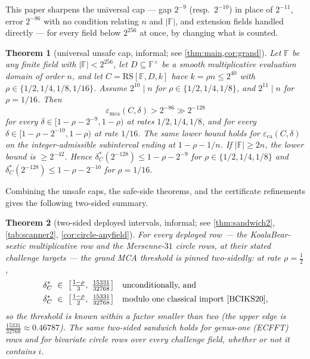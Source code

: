 \documentclass[11pt]{article}
\newtheorem{theorem}{Theorem}[section]
\theoremstyle{definition}
\theoremstyle{remark}
\newcommand{\F}{\mathbb{F}}
\newcommand{\RS}{\mathrm{RS}}
\newcommand{\eca}{\varepsilon_{\mathrm{ca}}}
\newcommand{\emca}{\varepsilon_{\mathrm{mca}}}
\begin{document}
This paper sharpens the universal cap --- gap $2^{-9}$ (resp.\ $2^{-10}$) in place of $2^{-11}$, error $2^{-86}$ with no condition relating $n$ and $|\F|$, and extension fields handled directly --- for every field below $2^{256}$ at once, by changing what is counted.


\begin{theorem}[universal unsafe cap, informal; see \cref{thm:main,cor:grand}]\label{thm:informal}
Let $\F$ be any finite field with $|\F|<2^{256}$, let $D\subseteq\F^\times$ be a smooth multiplicative evaluation domain of order $n$, and let $C=\RS[\F,D,k]$ have $k=\rho n\le2^{40}$ with $\rho\in\{1/2,1/4,1/8,1/16\}$. Assume $2^{10}\mid n$ for $\rho\in\{1/2,1/4,1/8\}$, and $2^{11}\mid n$ for $\rho=1/16$. Then
\[
\emca(C,\delta)>2^{-86}\gg2^{-128}
\]
for every $\delta\in[1-\rho-2^{-9},1-\rho)$ at rates $1/2,1/4,1/8$, and for every $\delta\in[1-\rho-2^{-10},1-\rho)$ at rate $1/16$. The same lower bound holds for $\eca(C,\delta)$ on the integer-admissible subinterval ending at $1-\rho-1/n$. If $|\F|\ge2n$, the lower bound is $\ge2^{-42}$. Hence $\delta^*_C(2^{-128})\le1-\rho-2^{-9}$ for $\rho\in\{1/2,1/4,1/8\}$ and $\delta^*_C(2^{-128})\le1-\rho-2^{-10}$ for $\rho=1/16$.
\end{theorem}

Combining the unsafe caps, the safe-side theorems, and the certificate refinements gives the following two-sided summary.

\begin{theorem}[two-sided deployed intervals, informal; see \cref{thm:sandwich2}, \cref{tab:scanner2}, \cref{cor:circle-anyfield}]\label{thm:informal-sandwich}
For every deployed row --- the KoalaBear-sextic multiplicative row and the Mersenne-$31$ circle rows, at their stated challenge targets --- the grand MCA threshold is pinned two-sidedly: at rate $\rho=\tfrac12$,
\begin{align*}
\delta^*_C\ &\in\ \bigl[\tfrac{1-\rho}3,\ \tfrac{15331}{32768}\bigr] &&\text{unconditionally, and}\\
\delta^*_C\ &\in\ \bigl[\tfrac{1-\rho}2,\ \tfrac{15331}{32768}\bigr] &&\text{modulo one classical import \cite{BCIKS20},}
\end{align*}
so the threshold is known within a factor smaller than two \textup(the upper edge is $\tfrac{15331}{32768}\approx0.46787$\textup). The same two-sided sandwich holds for genus-one \textup(ECFFT\textup) rows and for bivariate circle rows over every challenge field, whether or not it contains $i$.
\end{theorem}
\end{document}
